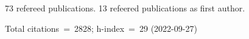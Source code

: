 73 refereed publications. 13 refeered publications as first author.

Total citations~=~2828; h-index~=~29 (2022-09-27)